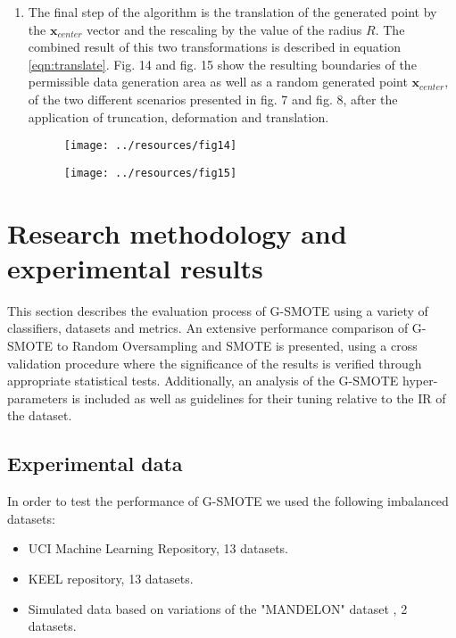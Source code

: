 \documentclass[parskip=full]{scrartcl}
\begin{document}
\begin{enumerate}
	\item The final step of the algorithm is the translation of the generated point by the \( \textbf{x}_{center} \) vector and the rescaling by the value of the radius \( R \). The combined result of this two transformations is described in equation \eqref{eqn:translate}. Fig. 14 and fig. 15 show the resulting boundaries of the permissible data generation area as well as a random generated point \( \textbf{x}_{center} \), of the two different scenarios presented in fig. 7 and fig. 8, after the application of truncation, deformation and translation.

	\begin{figure}[H]
		\centering
		\texttt{[image: ../resources/fig14]}
	\end{figure}
	
	\begin{figure}[H]
		\centering
		\texttt{[image: ../resources/fig15]}
	\end{figure}

\end{enumerate}

\section{Research methodology and experimental results}

This section describes the evaluation process of G-SMOTE using a variety of classifiers, datasets and metrics. An extensive performance comparison of G-SMOTE to Random Oversampling and SMOTE is presented, using a cross validation procedure where the significance of the results is verified through appropriate statistical tests. Additionally, an analysis of the G-SMOTE hyper-parameters is included as well as guidelines for their tuning relative to the IR of the dataset.

\subsection{Experimental data}

In order to test the performance of G-SMOTE we used the following imbalanced datasets:

\begin{itemize}
	
	\renewcommand\labelitemi{--}

	\item UCI Machine Learning Repository, 13 datasets.

	\item KEEL repository, 13 datasets.

	\item Simulated data based on variations of the "MANDELON" dataset \cite{Guyon2003}, 2 datasets.

\end{itemize}
\end{document}
